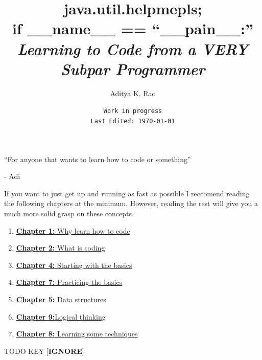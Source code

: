 \documentclass[12pt,a4paper]{book}
\newenvironment{dedication}
{%
	\thispagestyle{empty}%
	\vspace*{\stretch{1}}%
	\itshape             %
	\raggedleft          %
}
{\par %
	\vspace{\stretch{3}} %
	\clearpage           %
}
\begin{document}
	\title{java.util.helpmepls; \\
	if \_\_name\_\_ == ``\_\_pain\_\_:'' \\
	\large{\textit{Learning to Code from a VERY Subpar Programmer}}}
	\author{Aditya K. Rao}
	\date{\texttt{Work in progress \\ Last Edited: \today}}
	\maketitle

	\begin{dedication}
		``For anyone that wants to learn how to code or something''
		\par   %
		
		\vspace{\baselineskip}
		- Adi
	\end{dedication}
	
	\tableofcontents

	If you want to just get up and running as fast as possible I reccomend reading the following chapters at the minimum. However, reading the rest will give you a much more solid grasp on these concepts.
	\begin{enumerate}
		\item \href{chap:why-code}{\textbf{Chapter 1:} Why learn how to code}
		\item \href{chap:intro-coding}{\textbf{Chapter 2:} What is coding}
		\item \href{chap:basics}{\textbf{Chapter 4:} Starting with the basics}
		\item \href{chap:basics-practice}{\textbf{Chapter 7:} Practicing the basics}
		\item \href{chap:basics}{\textbf{Chapter 5:} Data structures}
		\item \href{chap:logical-thinking}{\textbf{Chapter 9:}Logical thinking}
		\item \href{chap:techniques}{\textbf{Chapter 8:} Learning some techniques}
	\end{enumerate}

	\listoftodos
	TODO KEY [\textbf{IGNORE}]
\end{document}
